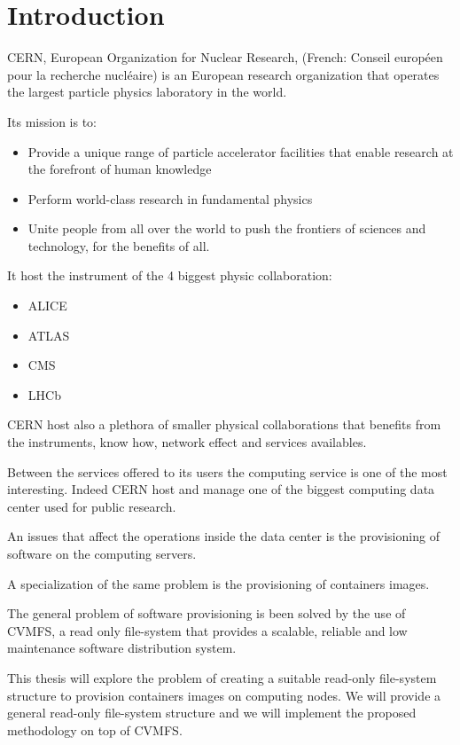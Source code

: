 \chapter{Introduction}\label{ch:introduction}

CERN, European Organization for Nuclear Research, (French: Conseil européen
pour la recherche nucléaire) is an European research organization that operates
the largest particle physics laboratory in the world.

Its mission is to: 
\begin{itemize}
	\item Provide a unique range of particle accelerator facilities that enable research at the forefront of human knowledge
	\item Perform world-class research in fundamental physics
	\item Unite people from all over the world to push the frontiers of sciences and technology, for the benefits of all.
\end{itemize}

It host the instrument of the 4 biggest physic collaboration: 
\begin{itemize}
\item ALICE
\item ATLAS
\item CMS
\item LHCb
\end{itemize}

CERN host also a plethora of smaller physical collaborations that benefits from
the instruments, know how, network effect and services availables.

Between the services offered to its users the computing service is one of the
most interesting. Indeed CERN host and manage one of the biggest computing
data center used for public research.

An issues that affect the operations inside the data center is the provisioning
of software on the computing servers.

A specialization of the same problem is the provisioning of containers images.

The general problem of software provisioning is been solved by the use of
CVMFS, a read only file-system that provides a scalable, reliable and low
maintenance software distribution system.

This thesis will explore the problem of creating a suitable read-only
file-system structure to provision containers images on computing nodes. We
will provide a general read-only file-system structure and we will implement the
proposed methodology on top of CVMFS.

